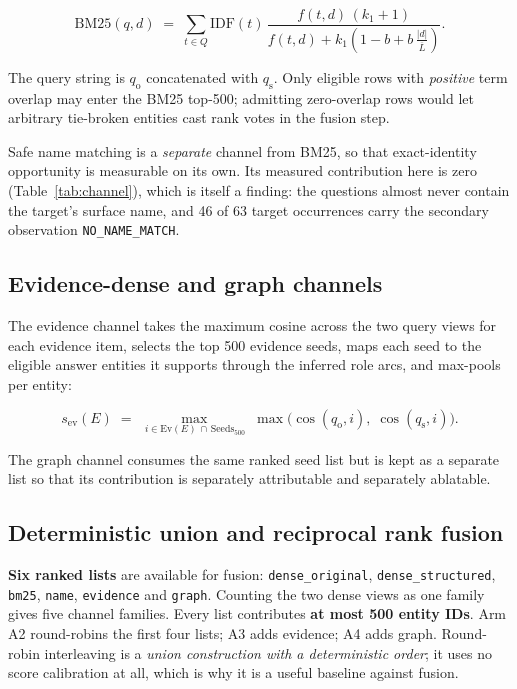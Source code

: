 \documentclass[11pt,a4paper]{article}
\begin{document}
\begin{equation}
\text{BM25}(q,d) \;=\; \sum_{t \in Q} \mathrm{IDF}(t)\,
\frac{f(t,d)\,(k_1+1)}{f(t,d) + k_1\!\left(1 - b + b\,\frac{|d|}{\overline{L}}\right)} .
\end{equation}

The query string is $q_{\text{o}}$ concatenated with $q_{\text{s}}$. Only eligible rows with \emph{positive}
term overlap may enter the BM25 top-500; admitting zero-overlap rows would let arbitrary tie-broken entities
cast rank votes in the fusion step.

Safe name matching is a \emph{separate} channel from BM25, so that exact-identity opportunity is measurable
on its own. Its measured contribution here is zero (Table~\ref{tab:channel}), which is itself a finding: the
questions almost never contain the target's surface name, and 46 of 63 target occurrences carry the
secondary observation \texttt{NO\_NAME\_MATCH}.

\subsection{Evidence-dense and graph channels}

The evidence channel takes the maximum cosine across the two query views for each evidence item, selects the
top 500 evidence seeds, maps each seed to the eligible answer entities it supports through the inferred role
arcs, and max-pools per entity:

\begin{equation}
s_{\text{ev}}(E) \;=\; \max_{\,i \in \mathrm{Ev}(E) \,\cap\, \mathrm{Seeds}_{500}} \;
\max\bigl(\cos(q_{\text{o}}, i),\; \cos(q_{\text{s}}, i)\bigr).
\end{equation}

The graph channel consumes the same ranked seed list but is kept as a separate list so that its contribution
is separately attributable and separately ablatable.

\subsection{Deterministic union and reciprocal rank fusion}

\textbf{Six ranked lists} are available for fusion: \texttt{dense\_original}, \texttt{dense\_structured},
\texttt{bm25}, \texttt{name}, \texttt{evidence} and \texttt{graph}. Counting the two dense views as one
family gives five channel families. Every list contributes \textbf{at most 500 entity IDs}. Arm A2
round-robins the first four lists; A3 adds evidence; A4 adds graph. Round-robin interleaving is a
\emph{union construction with a deterministic order}; it uses no score calibration at all, which is why it
is a useful baseline against fusion.
\end{document}
